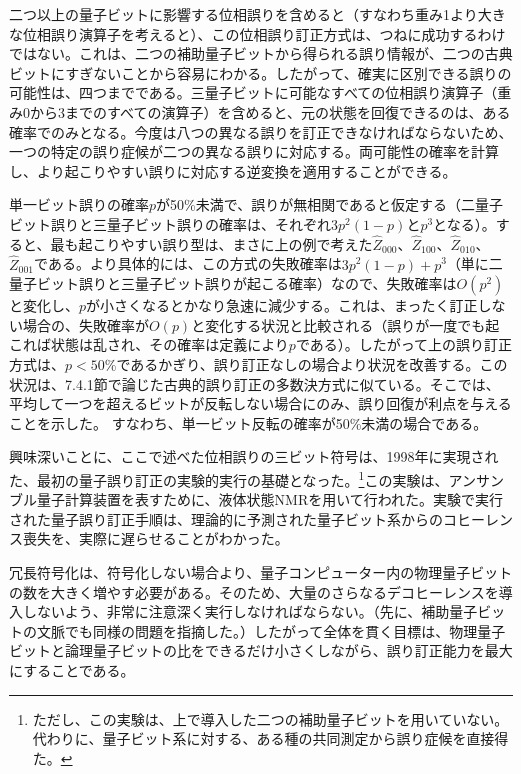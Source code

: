 二つ以上の量子ビットに影響する位相誤りを含めると（すなわち重み1より大きな位相誤り演算子を考えると）、この位相誤り訂正方式は、つねに成功するわけではない。これは、二つの補助量子ビットから得られる誤り情報が、二つの古典ビットにすぎないことから容易にわかる。したがって、確実に区別できる誤りの可能性は、四つまでである。三量子ビットに可能なすべての位相誤り演算子（重み0から3までのすべての演算子）を含めると、元の状態を回復できるのは、ある確率でのみとなる。今度は八つの異なる誤りを訂正できなければならないため、一つの特定の誤り症候が二つの異なる誤りに対応する。両可能性の確率を計算し、より起こりやすい誤りに対応する逆変換を適用することができる。

単一ビット誤りの確率$p$が50\%未満で、誤りが無相関であると仮定する（二量子ビット誤りと三量子ビット誤りの確率は、それぞれ$3p^2(1-p)$と$p^3$となる）。すると、最も起こりやすい誤り型は、まさに上の例で考えた$\hat Z_{000}$、$\hat Z_{100}$、$\hat Z_{010}$、$\hat Z_{001}$である。より具体的には、この方式の失敗確率は$3p^2(1-p)+p^3$（単に二量子ビット誤りと三量子ビット誤りが起こる確率）なので、失敗確率は$O(p^2)$と変化し、$p$が小さくなるとかなり急速に減少する。これは、まったく訂正しない場合の、失敗確率が$O(p)$と変化する状況と比較される（誤りが一度でも起これば状態は乱され、その確率は定義により$p$である）。したがって上の誤り訂正方式は、$p<50\%$であるかぎり、誤り訂正なしの場合より状況を改善する。この状況は、7.4.1節で論じた古典的誤り訂正の多数決方式に似ている。そこでは、平均して一つを超えるビットが反転しない場合にのみ、誤り回復が利点を与えることを示した。
\hypertarget{srcpage:320}{}\label{srcpage:320}
すなわち、単一ビット反転の確率が50\%未満の場合である。

興味深いことに、ここで述べた位相誤りの三ビット符号は、1998年に実現された、最初の量子誤り訂正の実験的実行\cite{ref361}の基礎となった。\footnote{ただし、この実験は、上で導入した二つの補助量子ビットを用いていない。代わりに、量子ビット系に対する、ある種の共同測定から誤り症候を直接得た。}この実験は、アンサンブル量子計算装置を表すために、液体状態NMRを用いて行われた\cite{ref351}。実験で実行された量子誤り訂正手順は、理論的に予測された量子ビット系からのコヒーレンス喪失を、実際に遅らせることがわかった。

冗長符号化は、符号化しない場合より、量子コンピューター内の物理量子ビットの数を大きく増やす必要がある。そのため、大量のさらなるデコヒーレンスを導入しないよう、非常に注意深く実行しなければならない。（先に、補助量子ビットの文脈でも同様の問題を指摘した。）したがって全体を貫く目標は、物理量子ビットと論理量子ビットの比をできるだけ小さくしながら、誤り訂正能力を最大にすることである。

